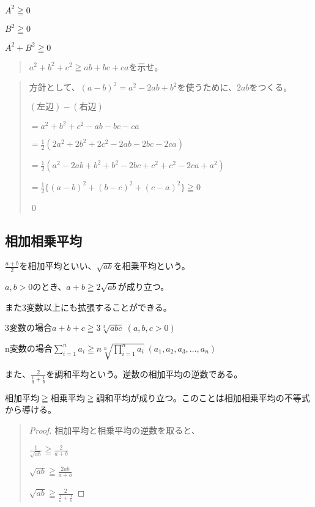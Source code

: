 \documentclass[uplatex,fleqn]{jsbook}
\begin{document}
$A^2\geqq 0$

$B^2\geqq 0$

$A^2+B^2\geqq 0$

\begin{quote}
    $a^2+b^2+c^2\geqq ab+bc+ca$を示せ。
\end{quote}

\begin{quote}
    方針として、$(a- b)^2=a^2-2ab+b^2$を使うために、$2ab$をつくる。

    $(\text{左辺})-(\text{右辺})$

    $=a^2+b^2+c^2-ab-bc-ca$

    $\displaystyle =\frac{1}{2}(2a^2+2b^2+2c^2-2ab-2bc-2ca)$

    $\displaystyle =\frac{1}{2}(a^2-2ab+b^2+b^2-2bc+c^2+c^2-2ca+a^2)$

    $\displaystyle =\frac{1}{2}\{(a-b)^2+(b-c)^2+(c-a)^2\}\geqq 0$

    \qed
\end{quote}

\subsection{相加相乗平均}
$\displaystyle \frac{a+b}{2}$を相加平均といい、$\sqrt{ab}$を相乗平均という。

$a,b>0$のとき、$a+b\geqq2\sqrt{ab}$が成り立つ。

また3変数以上にも拡張することができる。

3変数の場合$a+b+c\geqq 3\sqrt[3]{abc}\ (a,b,c>0)$

n変数の場合$\displaystyle \sum_{i=1}^n a_i\geqq n\sqrt[n]{\prod_{i=1}^n a_i}\ (a_1,a_2,a_3,\dots,a_n)$

また、$\displaystyle \frac{2}{\frac{1}{a}+\frac{1}{b}}$を調和平均という。逆数の相加平均の逆数である。

相加平均$\geqq$相乗平均$\geqq$調和平均が成り立つ。このことは相加相乗平均の不等式から導ける。
\begin{quote}
    \begin{proof}
        相加平均と相乗平均の逆数を取ると、

        $\displaystyle \frac{1}{\sqrt{ab}}\geqq\frac{2}{a+b}$

        $\displaystyle \sqrt{ab}\geqq\frac{2ab}{a+b}$

        $\displaystyle \sqrt{ab}\geqq\frac{2}{\frac{1}{a}+\frac{1}{b}}$
    \end{proof}
\end{quote}
\end{document}
